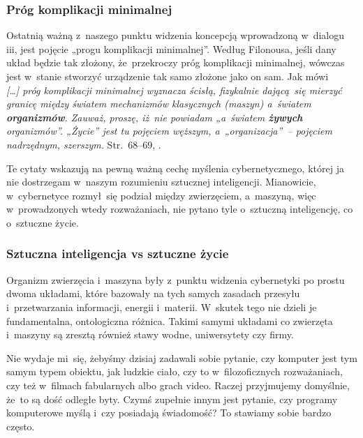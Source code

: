\documentclass[10pt,t]{beamer}
\begin{document}
\begin{frame}
  \frametitle{Próg komplikacji minimalnej}


  Ostatnią ważną z~naszego punktu widzenia koncepcją wprowadzoną w~dialogu
  iii, jest pojęcie „progu komplikacji minimalnej”. Według Filonousa, jeśli
  dany układ będzie tak złożony, że~przekroczy próg komplikacji minimalnej,
  wówczas jest w~stanie stworzyć urządzenie tak samo złożone jako on sam.
  Jak mówi \\
  \textit{[\ldots] próg komplikacji minimalnej wyznacza ścisłą, fizykalnie
    dającą~się mierzyć granicę między światem mechanizmów klasycznych
    (maszyn) a~światem \textbf{organizmów}. Zauważ, proszę, iż~nie powiadam
    „a~światem \textbf{żywych} organizmów”. „Życie” jest tu pojęciem
    węższym, a~„organizacja”~-- pojęciem nadrzędnym, szerszym.}
  Str.~$68\text{--}69$, \parencite{Lem-Dialogi-Vol-I-Pub-1996}.

  Te cytaty wskazują na pewną ważną cechę myślenia cybernetycznego, której
  ja nie dostrzegam w~naszym rozumieniu sztucznej inteligencji. Mianowicie,
  w~cybernetyce rozmył~się podział między zwierzęciem, a~maszyną, więc
  w~prowadzonych wtedy rozważaniach, nie pytano tyle o~sztuczną
  inteligencję, co o~\alert{sztuczne życie}.

\end{frame}





\begin{frame}
  \frametitle{Sztuczna inteligencja vs sztuczne życie}


  Organizm zwierzęcia i~maszyna były z~punktu widzenia cybernetyki po
  prostu dwoma układami, które bazowały na tych samych zasadach przesyłu
  i~przetwarzania informacji, energii i~materii. W~skutek tego nie dzieli
  je fundamentalna, ontologiczna różnica. Takimi samymi układami co
  zwierzęta i~maszyny są zresztą również stawy wodne, uniwersytety czy
  firmy.

  Nie wydaje mi~się, żebyśmy dzisiaj zadawali sobie pytanie, czy komputer
  jest tym samym typem obiektu, jak ludzkie ciało, czy to w~filozoficznych
  rozważaniach, czy też w~filmach fabularnych albo grach video. Raczej
  przyjmujemy domyślnie, że~to są dość odległe byty. Czymś zupełnie innym
  jest pytanie, czy \alert{programy} komputerowe myślą i~czy posiadają
  świadomość? To stawiamy sobie bardzo często.

\end{frame}
\end{document}
